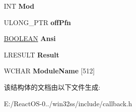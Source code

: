 \begin{DoxyCompactItemize}
I\+NT {\bfseries Mod}
\item 
\mbox{\label{struct___h_o_o_k_p_r_o_c___c_a_l_l_b_a_c_k___a_r_g_u_m_e_n_t_s_aa411cb924b3656b478cf1d52dadc60ef}} 
U\+L\+O\+N\+G\+\_\+\+P\+TR {\bfseries off\+Pfn}
\item 
\mbox{\label{struct___h_o_o_k_p_r_o_c___c_a_l_l_b_a_c_k___a_r_g_u_m_e_n_t_s_a6953b2de2ca968f084dfa4f6999a4ebe}} 
\hyperlink{_processor_bind_8h_a112e3146cb38b6ee95e64d85842e380a}{B\+O\+O\+L\+E\+AN} {\bfseries Ansi}
\item 
\mbox{\label{struct___h_o_o_k_p_r_o_c___c_a_l_l_b_a_c_k___a_r_g_u_m_e_n_t_s_a536439cfb6a2d00e61ed85724cabddc0}} 
L\+R\+E\+S\+U\+LT {\bfseries Result}
\item 
\mbox{\label{struct___h_o_o_k_p_r_o_c___c_a_l_l_b_a_c_k___a_r_g_u_m_e_n_t_s_a646c45051a215f8309579a6e2b6aa5f0}} 
W\+C\+H\+AR {\bfseries Module\+Name} \mbox{[}512\mbox{]}
\end{DoxyCompactItemize}


该结构体的文档由以下文件生成\+:\begin{DoxyCompactItemize}
\item 
E\+:/\+React\+O\+S-\/0../win32ss/include/callback.\+h\end{DoxyCompactItemize}
